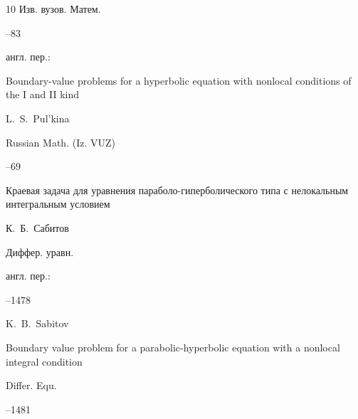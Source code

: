\begin{thebibliography}{10}
\jour Изв. вузов. Матем.



--83



\transl англ. пер.:~

\paper Boundary-value problems for a hyperbolic equation with nonlocal conditions of the I and II kind

\by L.~S.~Pul'kina 

\jour Russian Math. (Iz. VUZ)




--69







\paper  Краевая задача для уравнения параболо-гиперболического типа с нелокальным интегральным условием

\by К.~Б.~Сабитов

\jour Диффер. уравн.




\transl англ. пер.:~

--1478

\by K.~B.~Sabitov

\paper Boundary value problem for a parabolic-hyperbolic equation with a nonlocal integral condition

\jour  Differ. Equ. 



--1481 






\end{thebibliography}





\noindent

\hskip6.5cm \thedate \par\noindent

\hskip6.5cm\therevdate





\makeengtitle



\newpage



%


